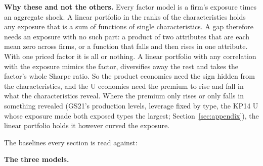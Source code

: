 \documentclass[11pt]{article}
\begin{document}
\textbf{Why these and not the others.} Every factor model is a firm's exposure times an aggregate shock. A linear portfolio in the ranks of the characteristics holds any exposure that is a sum of functions of single characteristics. A gap therefore needs an exposure with no such part: a product of two attributes that are each mean zero across firms, or a function that falls and then rises in one attribute. With one priced factor it is all or nothing. A linear portfolio with any correlation with the exposure mimics the factor, diversifies away the rest and takes the factor's whole Sharpe ratio. So the product economies need the sign hidden from the characteristics, and the U economies need the premium to rise and fall in what the characteristics reveal. Where the premium only rises or only falls in something revealed (GS21's production levels, leverage fixed by type, the KP14 U whose exposure made both exposed types the largest; Section~\ref{sec:appendix}), the linear portfolio holds it however curved the exposure.

The baselines every section is read against:



\textbf{The three models.}
\end{document}
